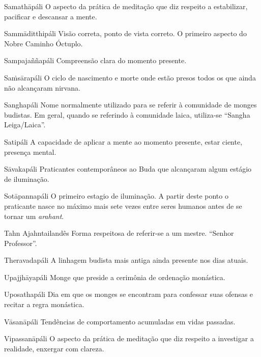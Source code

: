 \begin{glossarydescription}
  \item[{{Samathā}{páli}}] O aspecto da prática de meditação que diz respeito a estabilizar, pacificar e descansar a mente.

  \item[{{Sammāditthi}{páli}}] Visão correta, ponto de vista correto. O primeiro aspecto do Nobre Caminho Óctuplo.

  \item[{{Sampajañña}{páli}}] Compreensão clara do momento presente.

  \item[{{Saṁsāra}{páli}}] O ciclo de nascimento e morte onde estão presos todos os que ainda não alcançaram nirvana.

  \item[{{Sangha}{páli}}] Nome normalmente utilizado para se referir à comunidade de monges budistas. Em geral, quando se referindo à comunidade laica, utiliza-se “Sangha Leiga/Laica”.

  \item[{{Sati}{páli}}] A capacidade de aplicar a mente ao momento presente, estar ciente, presença mental.

  \item[{{Sāvaka}{páli}}] Praticantes contemporâneos ao Buda que alcançaram algum estágio de iluminação.

  \item[{{Sotāpanna}{páli}}] O primeiro estagio de iluminação. A partir deste ponto o praticante nasce no máximo mais sete vezes entre seres humanos antes de se tornar um \emph{arahant}.

  \item[{{Tahn Ajahn}{tailandês}}] Forma respeitosa de referir-se a um mestre. “Senhor Professor”.

  \item[{{Theravada}{páli}}] A linhagem budista mais antiga ainda presente nos dias atuais.

  \item[{{Upajjhāya}{páli}}] Monge que preside a cerimônia de ordenação monástica.

  \item[{{Uposatha}{páli}}] Dia em que os monges se encontram para confessar suas ofensas e recitar a regra monástica.

  \item[{{Vāsanā}{páli}}] Tendências de comportamento acumuladas em vidas passadas.

  \item[{{Vipassanā}{páli}}] O aspecto da prática de meditação que diz respeito a investigar a realidade, enxergar com clareza.

\end{glossarydescription}

